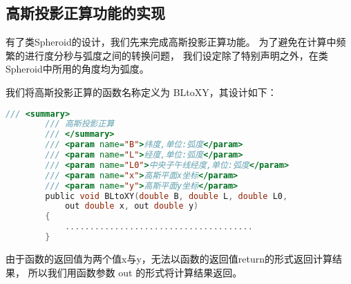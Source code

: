 \subsection{高斯投影正算功能的实现}
有了类Spheroid的设计，我们先来完成高斯投影正算功能。
为了避免在计算中频繁的进行度分秒与弧度之间的转换问题，
我们设定除了特别声明之外，在类Spheroid中所用的角度均为弧度。

我们将高斯投影正算的函数名称定义为 BLtoXY，其设计如下：

 \begin{lstlisting}[language=C]
        /// <summary>
        /// 高斯投影正算
        /// </summary>
        /// <param name="B">纬度,单位:弧度</param>
        /// <param name="L">经度,单位:弧度</param>
        /// <param name="L0">中央子午线经度,单位:弧度</param>
        /// <param name="x">高斯平面x坐标</param>
        /// <param name="y">高斯平面y坐标</param>
        public void BLtoXY(double B, double L, double L0,
            out double x, out double y)
        {
            ......................................
        }
 \end{lstlisting}

由于函数的返回值为两个值x与y，无法以函数的返回值return的形式返回计算结果，
所以我们用函数参数 out 的形式将计算结果返回。

